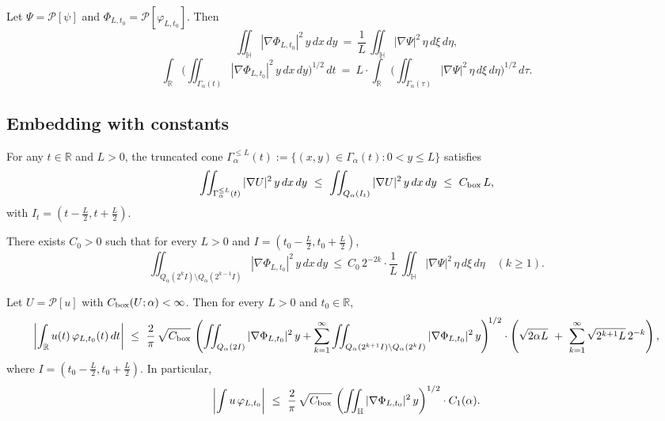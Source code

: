 \begin{lemma}\label{lem:scaling-embedding}
Let $\Psi=\mathcal{P}[\psi]$ and $\Phi_{L,t_0}=\mathcal{P}[\varphi_{L,t_0}]$. Then
\[
\iint_{\mathbb{H}} |\nabla \Phi_{L,t_0}|^2\,y\,dx\,dy\ =\ \frac{1}{L}\,\iint_{\mathbb{H}} |\nabla \Psi|^2\,\eta\,d\xi\,d\eta,
\]
\[
\int_{\mathbb{R}}\!\Big(\iint_{\Gamma_\alpha(t)} |\nabla \Phi_{L,t_0}|^2\,y\,dx\,dy\Big)^{1/2}\,dt\ =\ L\cdot \int_{\mathbb{R}}\!\Big(\iint_{\Gamma_\alpha(\tau)} |\nabla \Psi|^2\,\eta\,d\xi\,d\eta\Big)^{1/2}\,d\tau.
\]
\end{lemma}

\subsection*{Embedding with constants}

\begin{lemma}\label{lem:cone-box-embedding}
For any $t\in\mathbb{R}$ and $L>0$, the truncated cone $\Gamma_\alpha^{\le L}(t):=\{(x,y)\in\Gamma_\alpha(t): 0<y\le L\}$ satisfies
\[
\iint_{\Gamma_\alpha^{\le L}(t)}|\nabla U|^2\,y\,dx\,dy\ \le\ \iint_{Q_\alpha(I_t)}|\nabla U|^2\,y\,dx\,dy\ \le\ C_{\rm box}\,L,
\]
with $I_t=(t-\tfrac{L}{2},t+\tfrac{L}{2})$.
\end{lemma}

\begin{lemma}\label{lem:dyadic-tail-embedding}
There exists $C_0>0$ such that for every $L>0$ and $I=(t_0-\tfrac{L}{2},t_0+\tfrac{L}{2})$,
\[
\iint_{Q_\alpha(2^k I)\setminus Q_\alpha(2^{k-1} I)} |\nabla \Phi_{L,t_0}|^2\,y\,dx\,dy\ \le\ C_0\,2^{-2k}\cdot \frac{1}{L}\,\iint_{\mathbb{H}}|\nabla \Psi|^2\,\eta\,d\xi\,d\eta\quad (k\ge 1).
\]
\end{lemma}

\begin{theorem}\label{thm:embedding-embedding}
Let $U=\mathcal{P}[u]$ with $C_{\rm box}(U;\alpha)<\infty$. Then for every $L>0$ and $t_0\in\mathbb{R}$,
\[
\left|\int_{\mathbb{R}} u(t)\,\varphi_{L,t_0}(t)\,dt\right|
\ \le\ \frac{2}{\pi}\,\sqrt{C_{\rm box}}\,\left(
\iint_{Q_\alpha(2I)} |\nabla \Phi_{L,t_0}|^2\,y
+\sum_{k=1}^{\infty}\iint_{Q_\alpha(2^{k+1}I)\setminus Q_\alpha(2^{k}I)} |\nabla \Phi_{L,t_0}|^2\,y
\right)^{\!1/2}
\cdot\left( \sqrt{2\alpha L}\ +\ \sum_{k=1}^{\infty}\sqrt{2^{k+1}L}\,2^{-k}\right),
\]
where $I=(t_0-\tfrac{L}{2},t_0+\tfrac{L}{2})$. In particular,
\[
\left|\int u\,\varphi_{L,t_0}\right|
\ \le\ \frac{2}{\pi}\,\sqrt{C_{\rm box}}\,
\left(\iint_{\mathbb{H}} |\nabla \Phi_{L,t_0}|^2\,y\right)^{1/2}\cdot C_1(\alpha).
\]
\end{theorem}

